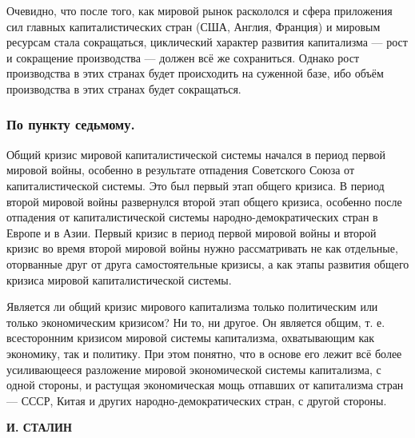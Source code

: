 \documentclass[12pt, a4paper, openany]{book}
\begin{document}
Очевидно, что после того, как мировой рынок раскололся и сфера приложения сил главных капиталистических стран (США, Англия, Франция) и мировым ресурсам стала сокращаться, циклический характер развития капитализма — рост и сокращение производства — должен всё же сохраниться. Однако рост производства в этих странах будет происходить на суженной базе, ибо объём производства в этих странах будет сокращаться.



\subsubsection*{По пункту седьмому.}





Общий кризис мировой капиталистической системы начался в период первой мировой войны, особенно в результате отпадения Советского Союза от капиталистической системы. Это был первый этап общего кризиса. В период второй мировой войны развернулся второй этап общего кризиса, особенно после отпадения от капиталистической системы народно-демократических стран в Европе и в Азии. Первый кризис в период первой мировой войны и второй кризис во время второй мировой войны нужно рассматривать не как отдельные, оторванные друг от друга самостоятельные кризисы, а как этапы развития общего кризиса мировой капиталистической системы.



Является ли общий кризис мирового капитализма только политическим или только экономическим кризисом? Ни то, ни другое. Он является общим, т. е. всесторонним кризисом мировой системы капитализма, охватывающим как экономику, так и политику. При этом понятно, что в основе его лежит всё более усиливающееся разложение мировой экономической системы капитализма, с одной стороны, и растущая экономическая мощь отпавших от капитализма стран — СССР, Китая и других народно-демократических стран, с другой стороны.





\begin{flushright}



\textbf{И. СТАЛИН}



\end{flushright}



\end{document}

